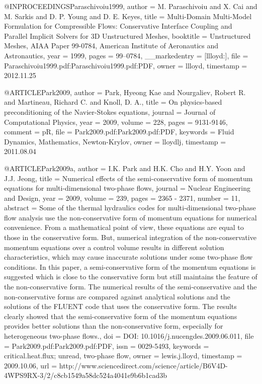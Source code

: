 {@INPROCEEDINGS{Paraschivoiu1999,
  author = {M. Paraschivoiu and X. Cai and M. Sarkis and D. P. Young and D. E.
	Keyes},
  title = {Multi-Domain Multi-Model Formulation for Compressible Flows: Conservative
	Interface Coupling and Parallel Implicit Solvers for {3D} Unstructured
	Meshes},
  booktitle = {Unstructured Meshes, AIAA Paper 99-0784, American Institute of Aeronautics
	and Astronautics},
  year = {1999},
  pages = {99--0784},
  __markedentry = {[llloyd:]},
  file = {Paraschivoiu1999.pdf:Paraschivoiu1999.pdf:PDF},
  owner = {llloyd},
  timestamp = {2012.11.25}
}

@ARTICLE{Park2009,
  author = {Park, Hyeong Kae and Nourgaliev, Robert R. and Martineau, Richard
	C. and Knoll, D. A.},
  title = {On physics-based preconditioning of the Navier-Stokes equations},
  journal = {Journal of Computational Physics},
  year = {2009},
  volume = {228},
  pages = {9131-9146},
  comment = {pR},
  file = {Park2009.pdf:Park2009.pdf:PDF},
  keywords = {Fluid Dynamics, Mathematics, Newton-Krylov},
  owner = {lloydlj},
  timestamp = {2011.08.04}
}

@ARTICLE{Park2009a,
  author = {I.K. Park and H.K. Cho and H.Y. Yoon and J.J. Jeong},
  title = {Numerical effects of the semi-conservative form of momentum equations
	for multi-dimensional two-phase flows},
  journal = {Nuclear Engineering and Design},
  year = {2009},
  volume = {239},
  pages = {2365 - 2371},
  number = {11},
  abstract = {Some of the thermal hydraulics codes for multi-dimensional two-phase
	flow analysis use the non-conservative form of momentum equations
	for numerical convenience. From a mathematical point of view, these
	equations are equal to those in the conservative form. But, numerical
	integration of the non-conservative momentum equations over a control
	volume results in different solution characteristics, which may cause
	inaccurate solutions under some two-phase flow conditions. In this
	paper, a semi-conservative form of the momentum equations is suggested
	which is close to the conservative form but still maintains the feature
	of the non-conservative form. The numerical results of the semi-conservative
	and the non-conservative forms are compared against analytical solutions
	and the solutions of the FLUENT code that uses the conservative form.
	The results clearly showed that the semi-conservative form of the
	momentum equations provides better solutions than the non-conservative
	form, especially for heterogeneous two-phase flows.},
  doi = {DOI: 10.1016/j.nucengdes.2009.06.011},
  file = {Park2009.pdf:Park2009.pdf:PDF},
  issn = {0029-5493},
  keywords = {critical.heat.flux; unread, two-phase flow},
  owner = {lewis.j.lloyd},
  timestamp = {2009.10.06},
  url = {http://www.sciencedirect.com/science/article/B6V4D-4WPS9RX-3/2/c8cb1549a58dc524a4041e9b6b1cad3b}
}

}
